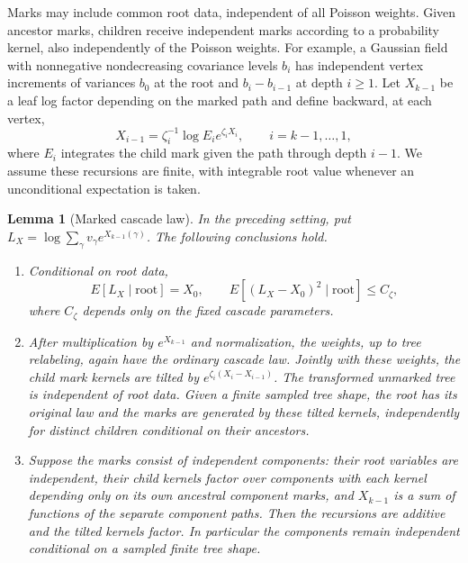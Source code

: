 \documentclass[11pt]{article}
\newtheorem{lemma}[theorem]{Lemma}
\begin{document}
Marks may include common root data, independent of all Poisson weights.
Given ancestor marks, children receive independent marks according to a
probability kernel, also independently of the Poisson weights. For example, a Gaussian field with nonnegative
nondecreasing covariance levels $b_i$ has independent vertex increments of
variances $b_0$ at the root and $b_i-b_{i-1}$ at depth $i\ge1$.
Let $X_{k-1}$ be a leaf log factor depending on the marked path and define
backward, at each vertex,
\begin{equation}\label{eq:marked-recursion}
 X_{i-1}=\zeta_i^{-1}\log E_i e^{\zeta_i X_i},
 \qquad i=k-1,\ldots,1,
\end{equation}
where $E_i$ integrates the child mark given the path through depth $i-1$.
We assume these recursions are finite, with integrable root value whenever
an unconditional expectation is taken.

\begin{lemma}[Marked cascade law]\label{lem:marked-cascade}
In the preceding setting, put
$L_X=\log\sum_\gamma v_\gamma e^{X_{k-1}(\gamma)}$.
The following conclusions hold.
\begin{enumerate}
\item Conditional on root data,
\[
 E[L_X\mid\text{root}]=X_0,\qquad
 E[(L_X-X_0)^2\mid\text{root}]\le C_\zeta,
\]
where $C_\zeta$ depends only on the fixed cascade parameters.
\item After multiplication by $e^{X_{k-1}}$ and normalization, the weights,
up to tree relabeling, again have the ordinary cascade law. Jointly with
these weights, the child mark kernels are tilted by
$e^{\zeta_i(X_i-X_{i-1})}$. The transformed unmarked tree is independent
of root data. Given a finite sampled tree shape, the root has its original
law and the marks are generated by these tilted kernels, independently
for distinct children conditional on their ancestors.
\item Suppose the marks consist of independent components: their root
variables are independent, their child kernels factor over components
with each kernel depending only on its own ancestral component marks,
and $X_{k-1}$ is a sum of functions of the separate component paths.
Then the recursions are additive and the tilted kernels factor. In
particular the components remain independent conditional on a sampled
finite tree shape.
\end{enumerate}
\end{lemma}
\end{document}
